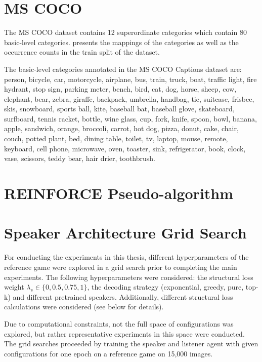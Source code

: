 \section{MS COCO}
The MS COCO dataset \parencite{chen2015microsoft} contains 12 superordinate categories which contain 80 basic-level categories.  presents the mappings of the categories as well as the occurrence counts in the train split of the dataset. 

The basic-level categories annotated in the MS COCO Captions dataset are: person, bicycle, car, motorcycle, airplane, bus, train, truck, boat, traffic light, fire hydrant, stop sign, parking meter, bench, bird, cat, dog, horse, sheep, cow, elephant, bear, zebra, giraffe, backpack, umbrella, handbag, tie, suitcase, frisbee, skis, snowboard, sports ball, kite, baseball bat, baseball glove, skateboard, surfboard, tennis racket, bottle, wine glass, cup, fork, knife, spoon, bowl, banana, apple, sandwich, orange, broccoli, carrot, hot dog, pizza, donut, cake, chair, couch, potted plant, bed, dining table, toilet, tv, laptop, mouse, remote, keyboard, cell phone, microwave, oven, toaster, sink, refrigerator, book, clock, vase, scissors, teddy bear, hair drier, toothbrush.


\section{REINFORCE Pseudo-algorithm}

\section{Speaker Architecture Grid Search}
\label{app:grid_search}

For conducting the experiments in this thesis, different hyperparameters of the reference game were explored in a grid search prior to completing the main experiments. The following hyperparameters were considered: the structural loss weight $\lambda_s \in \{0, 0.5, 0.75, 1\}$, the decoding strategy (exponential, greedy, pure, top-k) and different pretrained speakers. Additionally, different structural loss calculations were considered (see below for details). 

Due to computational constraints, not the full space of configurations was explored, but rather representative experiments in this space were conducted. The grid searches proceeded by training the speaker and listener agent with given configurations for one epoch on a reference game on 15,000 images. 

